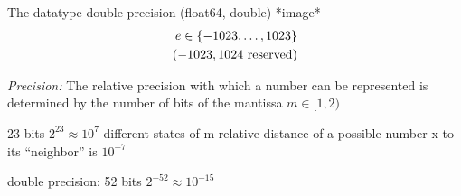 The datatype double precision (float64, double)
*image*
\begin{align*}
    e \in \{ -1023, \ldots, 1023 \} \\
    (-1023, 1024 \hbox{ reserved})
\end{align*}

\emph{Precision:} The relative precision with which a number
can be represented is determined by the number of bits of the mantissa $m \in [1, 2 )$

23 bits \textrightarrow{} $2^{23} \approx 10^7$ different states of m \textrightarrow{} relative distance of a possible number x to its ``neighbor'' is $10^{-7}$


double precision: 52 bits \textrightarrow $2^{-52} \approx 10^{-15}$
